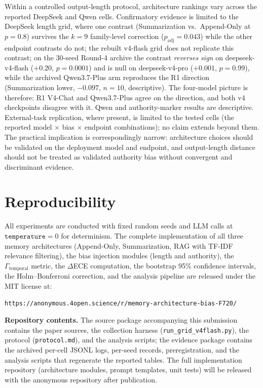 \documentclass[11pt]{article}
\begin{document}
Within a controlled output-length protocol, architecture rankings vary across the reported DeepSeek and Qwen cells. Confirmatory evidence is limited to the DeepSeek length grid, where one contrast (Summarization vs.\ Append-Only at $p{=}0.8$) survives the $k{=}9$ family-level correction ($p_{\text{adj}}{=}0.043$) while the other endpoint contrasts do not; the rebuilt v4-flash grid does not replicate this contrast; on the 30-seed Round-4 archive the contrast \emph{reverses sign} on deepseek-v4-flash ($+0.20$, $p{=}0.0001$) and is null on deepseek-v4-pro ($+0.001$, $p{=}0.99$), while the archived Qwen3.7-Plus arm reproduces the R1 direction (Summarization lower, $-0.097$, $n{=}10$, descriptive). The four-model picture is therefore: R1 V4-Chat and Qwen3.7-Plus agree on the direction, and both v4 checkpoints disagree with it. Qwen and authority-marker results are descriptive. External-task replication, where present, is limited to the tested cells (the reported model $\times$ bias $\times$ endpoint combinations); no claim extends beyond them. The practical implication is correspondingly narrow: architecture choices should be validated on the deployment model and endpoint, and output-length distance should not be treated as validated authority bias without convergent and discriminant evidence.


\section*{Reproducibility}
\label{sec:reproducibility}

All experiments are conducted with fixed random seeds and LLM calls at $\texttt{temperature}=0$ for determinism. The complete implementation of all three memory architectures (Append-Only, Summarization, RAG with TF-IDF relevance filtering), the bias injection modules (length and authority), the $\Gamma_\text{temporal}$ metric, the $\Delta$ECE computation, the bootstrap 95\% confidence intervals, the Holm--Bonferroni correction, and the analysis pipeline are released under the MIT license at:

\begin{center}
\texttt{https://anonymous.4open.science/r/memory-architecture-bias-F720/}
\end{center}

\noindent\textbf{Repository contents.}
The source package accompanying this submission contains the paper sources, the collection harness (\texttt{run\_grid\_v4flash.py}), the protocol (\texttt{protocol.md}), and the analysis scripts; the evidence package contains the archived per-cell JSONL logs, per-seed records, preregistration, and the analysis scripts that regenerate the reported tables. The full implementation repository (architecture modules, prompt templates, unit tests) will be released with the anonymous repository after publication.
\end{document}
